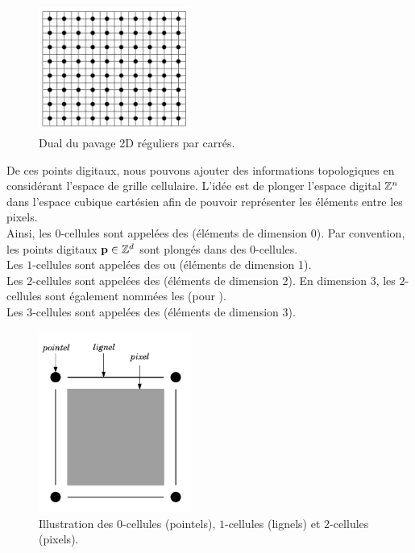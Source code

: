 \begin{figure}[ht]
  \begin{center}
    \includegraphics[width=5cm]{images/Notions/Pavage_dual}
    \caption{Dual du pavage 2D réguliers par carrés.\label{fig:pavage_dual}}
  \end{center}
\end{figure}

De ces points digitaux, nous pouvons ajouter des informations topologiques en
considérant l'espace de grille cellulaire. L'idée est de plonger l'espace
digital $\mathbb{Z}^n$ dans l'espace cubique cartésien afin de pouvoir représenter les
éléments entre les pixels.
%
\\
%
Ainsi, les $0$-cellules sont appelées des  (éléments de
dimension 0). Par convention, les points digitaux $\mathbf{p} \in \mathbb{Z}^d$ sont plongés
dans des $0$-cellules.
%
\\
%
Les $1$-cellules sont appelées des  ou 
(éléments de dimension 1).
%
\\
%
Les $2$-cellules sont appelées des  (éléments de dimension 2).
En dimension 3, les $2$-cellules sont également nommées les 
(pour ).
%
\\
%
Les $3$-cellules sont appelées des  (éléments de dimension 3).


\begin{figure}[ht]
  \begin{center}
    \includegraphics[width=5cm]{images/Notions/notations_topo}
    \caption{Illustration des $0$-cellules (pointels), $1$-cellules (lignels) et
    $2$-cellules (pixels).\label{fig:notations_topo}}
  \end{center}
\end{figure}


